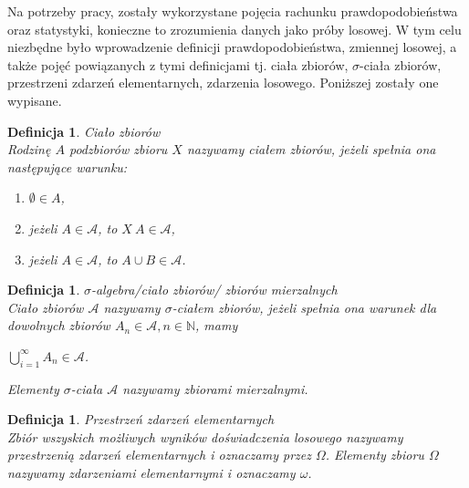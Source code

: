 \documentclass[12pt,a4paper]{report}
\newtheorem{definition}[theorem]{Definicja}
\begin{document}
Na potrzeby pracy, zostały wykorzystane pojęcia rachunku prawdopodobieństwa oraz statystyki, konieczne to zrozumienia danych jako próby losowej. W tym celu niezbędne było wprowadzenie definicji prawdopodobieństwa, zmiennej losowej, a także pojęć powiązanych z tymi definicjami tj. ciała zbiorów, $\sigma$-ciała zbiorów, przestrzeni zdarzeń elementarnych, zdarzenia losowego. Poniższej zostały one wypisane.\\

\begin{definition}{Ciało zbiorów \cite[Rozdział 8.1]{rudnicki2006}\\}
Rodzinę $A$ podzbiorów zbioru $X$ nazywamy ciałem zbiorów, jeżeli spełnia ona następujące warunku: \\
\begin{enumerate}
\item $\emptyset \in A$,
\item jeżeli $A \in \mathcal{A}$, to $X \ A \in \mathcal{A}$,
\item jeżeli $A \in \mathcal{A}$, to $A \cup B \in \mathcal{A}$.\\
\end{enumerate}
\end{definition}

\begin{definition}{$\sigma$-algebra/ciało zbiorów/ zbiorów mierzalnych\cite[Rozdział 8.1]{rudnicki2006}\\}
Ciało zbiorów $\mathcal{A}$ nazywamy $\sigma$-ciałem zbiorów, jeżeli spełnia ona warunek
dla dowolnych zbiorów $A_{n} \in \mathcal{A}, n \in \mathbb{N}$, mamy
\begin{center}
$\bigcup\limits_{i=1}^{\infty} A_n \in \mathcal{A}$.
\end{center}
Elementy $\sigma$-ciała $\mathcal{A}$ nazywamy zbiorami mierzalnymi.\\
\end{definition}

\begin{definition}{Przestrzeń zdarzeń elementarnych \cite[w oparciu o rozdział 1.1]{krysicki1999}\\}
Zbiór wszyskich możliwych wyników doświadczenia losowego nazywamy przestrzenią zdarzeń elementarnych i oznaczamy przez $\Omega$. Elementy zbioru $\Omega$ nazywamy zdarzeniami elementarnymi i oznaczamy $\omega$.\\
\end{definition}
\end{document}
